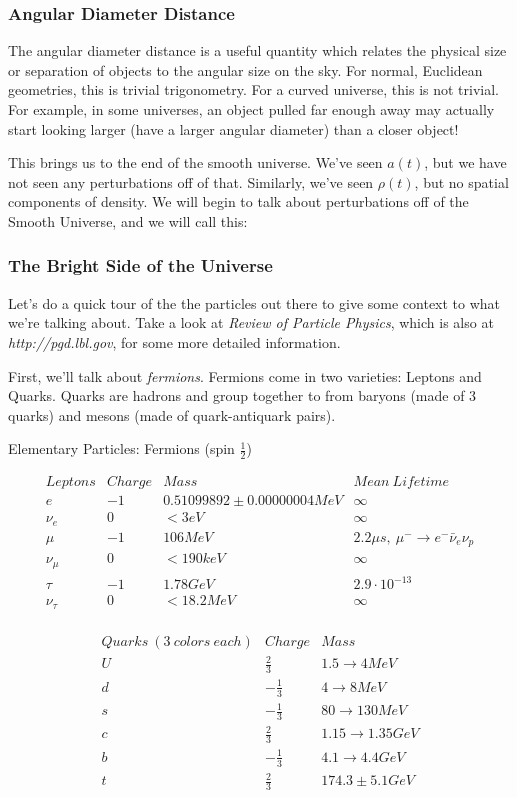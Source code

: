 \documentclass{article}
\def\hf{\frac12}
\def\hf{\frac12}
\begin{document}
\subsubsection*{ Angular Diameter Distance}

The angular diameter distance is a useful quantity which relates the physical
size or separation of objects to the angular size on the sky.  For normal,
Euclidean geometries, this is trivial trigonometry.  For a curved universe,
this is not trivial.  For example, in some universes, an object pulled
far enough away may actually start looking larger (have a larger angular
diameter) than a closer object!\par
This brings us to the end of the smooth universe.  We've seen $a(t)$, but we
have not seen any perturbations off of that.  Similarly, we've seen $\rho (t)$,
but no spatial components of density.  We will begin to talk about perturbations
off of the Smooth Universe, and we will call this:

\subsubsection*{ The Bright Side of the Universe}

Let's do a quick tour of the the particles out there to give some context
to what we're talking about.  Take a look at {\it Review of Particle Physics},
which is also at {\it http://pgd.lbl.gov}, for some more detailed information.
\par
First, we'll talk about {\it fermions}.  Fermions come in two varieties:
Leptons and Quarks.  Quarks are hadrons and group together to from
baryons (made of 3 quarks) and mesons (made of quark-antiquark pairs).
\centerline{Elementary Particles: Fermions (spin $\hf$)}
$$\begin{matrix} 
Leptons&Charge&Mass&Mean\ Lifetime\\
e&-1&0.51099892\pm0.00000004 MeV&\infty\\
\nu_e&0&<3 eV&\infty\\
\mu&-1&106 MeV&2.2\mu s,\ \mu^-\to e^-\bar \nu_e\nu_p\\
\nu_\mu&0&<190 keV&\infty\\
\tau&-1&1.78 GeV&2.9\cdot 10^{-13}\\
\nu_\tau&0&<18.2 MeV&\infty\\\end{matrix}$$

$$\begin{matrix} 
Quarks\ (3\ colors\ each)&Charge&Mass\\
U&\frac{2}{ 3}&1.5 \to 4 MeV\\
d&-\frac{1}{ 3}&4 \to 8 MeV\\
s&-\frac{1}{ 3}&80 \to 130 MeV\\
c&\frac{2}{ 3}&1.15 \to 1.35 GeV\\
b&-\frac{1}{ 3}&4.1 \to 4.4 GeV\\
t&\frac{2}{ 3}&174.3 \pm 5.1 GeV\\\end{matrix}$$
\end{document}
